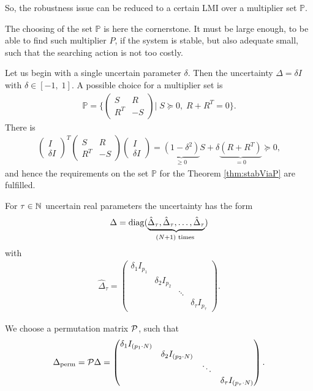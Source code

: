 So, the robustness issue can be reduced to a certain LMI over a multiplier set $\mathbb{P}$. 

The choosing of the set $\mathbb{P}$ is here the cornerstone. It must be large enough, to be able to find such multiplier $P$, if the system is stable, but also adequate small, such that the searching action is not too costly. 
 
Let us begin with a single uncertain parameter $\delta$. Then the uncertainty $\Delta = \delta I$ with $\delta \in [-1,\; 1]$. 
A possible choice for a multiplier set is 
\begin{align}
\mathbb{P}= \{ \begin{pmatrix}
S & R \\ R^T & -S
\end{pmatrix}| \; S \succeq 0 , \; R + R^T = 0\}.
\end{align}
There is 
\begin{align}
\begin{pmatrix}
I \\ \delta I
\end{pmatrix}^T 
\begin{pmatrix}
S & R \\ R^T & -S
\end{pmatrix}
\begin{pmatrix}
I \\ \delta I
\end{pmatrix} = \underbrace{(1 - \delta^2 )}_{\geq 0}S + \delta\underbrace{(R + R^T)}_{=0} \succeq 0,
\end{align}
and hence the requirements on the set $\mathbb{P}$ for the Theorem \eqref{thm:stabViaP} are fulfilled. 

For $\tau \in {\mathbb{N}}$ uncertain real parameters the uncertainty has the form 
\begin{align}\Delta= \operatorname*{diag}(\underbrace{\hat{\Delta}_\tau, \hat{\Delta}_\tau, \dots, \hat{\Delta}_\tau}_{(N+1) \text{ times }})\end{align}
with
\begin{align}
\hat{\Delta}_\tau = \begin{pmatrix}
\delta_1 I_{p_1}& & & \\
& \delta_2 I_{p_2} & & \\
& & \ddots & \\
& & & \delta_\tau I_{p_\tau}
\end{pmatrix}.
\end{align}

We choose a permutation matrix $\mathcal{P}$, such that 
\begin{align}
\label{eq:rob:PDelta}
\Delta_\text{perm}= 
\mathcal{P} \Delta =
\begin{pmatrix}
\delta_1 I_{(p_1\cdot N)} & & &\\
& \delta_2 I_{(p_2\cdot N)} & & \\
& & \ddots & \\
& & & \delta_\tau I_{(p_\tau \cdot N)}
\end{pmatrix}.
\end{align}

